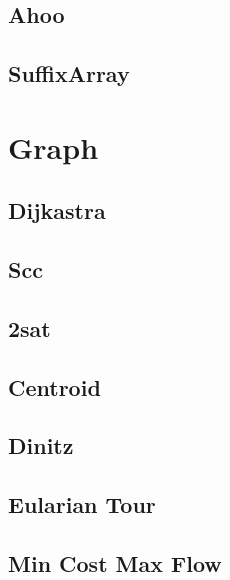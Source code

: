 \subsection{Ahoo}
\raggedbottom
\subsection{SuffixArray}
\raggedbottom
\hrulefill



\section{Graph}
\subsection{Dijkastra}
\raggedbottom
\subsection{Scc}
\raggedbottom
\subsection{2sat}
\raggedbottom
\subsection{Centroid}
\raggedbottom
\subsection{Dinitz}
\raggedbottom
\subsection{Eularian Tour}
\raggedbottom
\subsection{Min Cost Max Flow}
\raggedbottom
\hrulefill

